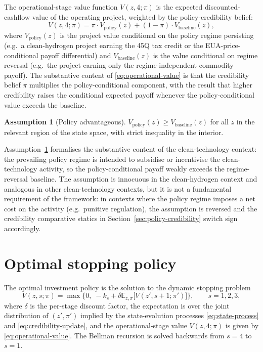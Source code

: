 \documentclass[12pt,a4paper]{article}
\newcommand{\E}{\mathbb{E}}
\theoremstyle{plain}
\theoremstyle{definition}
\newtheorem{assumption}{Assumption}
\begin{document}
The operational-stage value function $V(z, 4; \pi)$ is the expected discounted-cashflow value of the operating project, weighted by the policy-credibility belief:
\begin{equation}
V(z, 4; \pi) = \pi \cdot V_{\text{policy}}(z) + (1 - \pi) \cdot V_{\text{baseline}}(z),
\label{eq:operational-value}
\end{equation}
where $V_{\text{policy}}(z)$ is the project value conditional on the policy regime persisting (e.g.\ a clean-hydrogen project earning the 45Q tax credit or the EUA-price-conditional payoff differential) and $V_{\text{baseline}}(z)$ is the value conditional on regime reversal (e.g.\ the project earning only the regime-independent commodity payoff). The substantive content of \eqref{eq:operational-value} is that the credibility belief $\pi$ multiplies the policy-conditional component, with the result that higher credibility raises the conditional expected payoff whenever the policy-conditional value exceeds the baseline.

\begin{assumption}[Policy advantageous]
\label{ass:policy-advantage}
$V_{\text{policy}}(z) \geq V_{\text{baseline}}(z)$ for all $z$ in the relevant region of the state space, with strict inequality in the interior.
\end{assumption}
\noindent Assumption~\ref{ass:policy-advantage} formalises the substantive content of the clean-technology context: the prevailing policy regime is intended to subsidise or incentivise the clean-technology activity, so the policy-conditional payoff weakly exceeds the regime-reversal baseline. The assumption is innocuous in the clean-hydrogen context and analogous in other clean-technology contexts, but it is not a fundamental requirement of the framework: in contexts where the policy regime imposes a net cost on the activity (e.g.\ punitive regulation), the assumption is reversed and the credibility comparative statics in Section~\ref{sec:policy-credibility} switch sign accordingly.

\section{Optimal stopping policy}
\label{sec:optimal-stopping}

The optimal investment policy is the solution to the dynamic stopping problem
\begin{equation}
V(z, s; \pi) = \max\Big\{0,\; -k_s + \delta \E_{z, \pi}\!\big[V(z', s+1; \pi')\big]\Big\}, \qquad s = 1, 2, 3,
\label{eq:bellman-recursion}
\end{equation}
where $\delta$ is the per-stage discount factor, the expectation is over the joint distribution of $(z', \pi')$ implied by the state-evolution processes \eqref{eq:state-process} and \eqref{eq:credibility-update}, and the operational-stage value $V(z, 4; \pi)$ is given by \eqref{eq:operational-value}. The Bellman recursion is solved backwards from $s = 4$ to $s = 1$.
\end{document}
